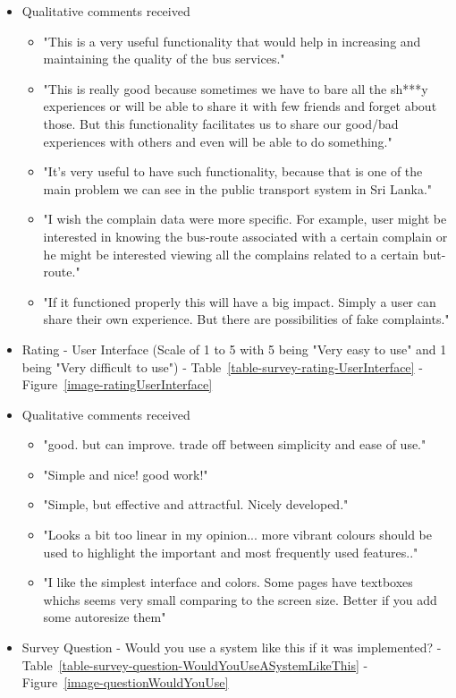 \documentclass[12pt, oneside]{report}
\begin{document}
\begin {itemize}
\item Qualitative comments received
\begin {itemize}
\item "This is a very useful functionality that would help in increasing and maintaining the quality of the bus services."
\item "This is really good because sometimes we have to bare all the sh***y experiences or will be able to share it with few friends and forget about those. But this functionality facilitates us to share our good/bad experiences with others and even will be able to do something."
\item "It's very useful to have such functionality, because that is one of  the main problem we can see in the public transport system in Sri Lanka."
\item "I wish the complain data were more specific. For example, user might be interested in knowing the bus-route associated with a certain complain or he might be interested viewing all the complains related to a certain but-route."
\item "If it functioned properly this will have a big impact. Simply a user can share their own experience. But there are possibilities of fake complaints."
\end {itemize}

\item Rating - User Interface (Scale of 1 to 5 with 5 being "Very easy to use" and 1 being "Very difficult to use") - Table~\ref{table-survey-rating-UserInterface} - Figure~\ref{image-ratingUserInterface}

\item Qualitative comments received
\begin {itemize}
\item "good. but can improve. trade off between simplicity and ease of use."
\item "Simple and nice! good work!"
\item "Simple, but effective and attractful. Nicely developed."
\item "Looks a bit too linear in my opinion... more vibrant colours should be used to highlight the important and most frequently used features.."
\item "I like the simplest interface and colors. Some pages have textboxes whichs seems very small comparing to the screen size. Better if you add some autoresize them"
\end {itemize}

\item Survey Question - Would you use a system like this if it was implemented? - Table~\ref{table-survey-question-WouldYouUseASystemLikeThis} - Figure~\ref{image-questionWouldYouUse}


\end{itemize}
\end{document}
